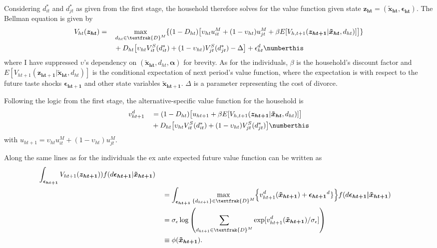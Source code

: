 Considering $d_{it}^*$ and $d_{jt}^*$ as given from the first stage, the household therefore solves for the value function given state $\boldsymbol{z_{ht}}=(\boldsymbol{\tilde{x}_{ht}},\boldsymbol{\epsilon_{ht}})$. The Bellman equation is given by
\begin{alignat*}{3}
&V_{ht}(\boldsymbol{z_{ht}})=&&\max_{d_{ht}\in \textfrak{D}^M} \{ (1-D_{ht})\big[\upsilon_{ht} u_{it}^M+(1-\upsilon_{ht})u_{jt}^M +\beta E[V_{h,t+1}(\boldsymbol{z_{ht+1}}|\boldsymbol{\tilde{x}_{ht}},d_{ht})] \big] \} \\
& &&+D_{ht}\big[\upsilon_{ht} V_{it}^S(d_{it}^*)+(1-\upsilon_{ht}) V_{jt}^S(d_{jt}^*) -\Delta \big]+\epsilon_{ht}^d 
\numberthis
\label{eq:Vh}
\end{alignat*}
where I have suppressed $\upsilon$'s dependency on $(\boldsymbol{\tilde{x}_{ht}},d_{ht},\boldsymbol{\alpha})$ for brevity. As for the individuals, $\beta$ is the household's discount factor and $E[V_{ht+1}(\boldsymbol{z_{ht+1}}|\boldsymbol{\tilde{x}_{ht}},d_{ht})]$ is the conditional expectation of next period's value function, where the expectation is with respect to the future taste shocks $\boldsymbol{\epsilon_{ht+1}}$ and other state variables $\boldsymbol{\tilde{x}_{ht+1}}$. $\Delta$ is a parameter representing the cost of divorce.

Following the logic from the first stage, the alternative-specific value function for the household is
\begin{alignat*}{3}
&v_{ht+1}^d&&=(1-D_{ht})\big[u_{ht+1}+\beta E[V_{h,t+1}(\boldsymbol{z_{ht+1}}|\boldsymbol{\tilde{x}_{ht}},d_{ht})]\big] \\
& &&+D_{ht}\big[\upsilon_{ht} V_{it}^S(d_{it}^*)+(1-\upsilon_{ht})V_{jt}^S(d_{jt}^*)\big] \numberthis
\label{eq:vh}
\end{alignat*}
with $u_{ht+1}=\upsilon_{ht} u_{it}^M+(1-\upsilon_{ht})u_{jt}^M$. 

Along the same lines as for the individuals the ex ante expected future value function can be written as
\begin{alignat*}{3}
\int_{\boldsymbol{\epsilon_{ht+1}}}{ V_{ht+1}(\boldsymbol{z_{ht+1}}))f(d\boldsymbol{\epsilon_{ht+1}}|\boldsymbol{\tilde{x}_{ht+1}})} \\
& &&= \int_{\boldsymbol{\epsilon_{ht+1}}}{ \max_{\{d_{ht+1}\}\in \textfrak{D}^M_{}} } \Big\{v_{ht+1}^{d_{}}(\boldsymbol{\tilde{x}_{ht+1}}) +\boldsymbol{\epsilon_{ht+1}}^{d_{}}\} \Big\}f(d\boldsymbol{\epsilon_{ht+1}|\tilde{x}_{ht+1}}) \\
& &&=\sigma_{\epsilon} \log {\left( \sum_{d_{ht+1} \in \textfrak{D}^M} { \exp[v_{ht+1}^{d_{}}(\boldsymbol{\tilde{x}_{ht+1}})/ \sigma_{\epsilon}]  } \right)} \\
& &&\equiv\phi(\boldsymbol{\tilde{x}_{ht+1}}). 
\end{alignat*}


